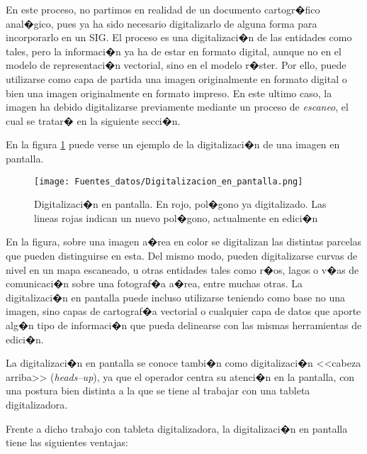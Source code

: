 En este proceso, no partimos en realidad de un documento cartogr�fico anal�gico, pues ya ha sido necesario digitalizarlo de alguna forma para incorporarlo en un SIG. El proceso es una digitalizaci�n de las entidades como tales, pero la informaci�n ya ha de estar en formato digital, aunque no en el modelo de representaci�n vectorial, sino en el modelo r�ster. Por ello, puede utilizarse como capa de partida una imagen originalmente en formato digital o bien una imagen originalmente en formato impreso. En este ultimo caso, la imagen ha debido digitalizarse previamente mediante un proceso de \emph{escaneo}, el cual se tratar� en la siguiente secci�n.

En la figura \ref{Fig:Digitalizacion_en_pantalla} puede verse un ejemplo de la digitalizaci�n de una imagen en pantalla.

\begin{figure}[!hbt]   
\centering
\texttt{[image: Fuentes\_datos/Digitalizacion\_en\_pantalla.png]}
\caption{\small Digitalizaci�n en pantalla. En rojo, pol�gono ya digitalizado. Las lineas rojas indican un nuevo pol�gono, actualmente en edici�n}
\label{Fig:Digitalizacion_en_pantalla} 
\end{figure}

En la figura, sobre una imagen a�rea en color se digitalizan las distintas parcelas que pueden distinguirse en esta. Del mismo modo, pueden digitalizarse curvas de nivel en un mapa escaneado, u otras entidades tales como r�os, lagos o v�as de comunicaci�n sobre una fotograf�a a�rea, entre muchas otras. La digitalizaci�n en pantalla puede incluso utilizarse teniendo como base no una imagen, sino capas de cartograf�a vectorial o cualquier capa de datos que aporte alg�n tipo de informaci�n que pueda delinearse con las mismas herramientas de edici�n.

La digitalizaci�n en pantalla se conoce tambi�n como digitalizaci�n <<cabeza arriba>> (\emph{heads--up}), ya que el operador centra su atenci�n en la pantalla, con una postura bien distinta a la que se tiene al trabajar con una tableta digitalizadora.

Frente a dicho trabajo con tableta digitalizadora, la digitalizaci�n en pantalla tiene las siguientes ventajas:

